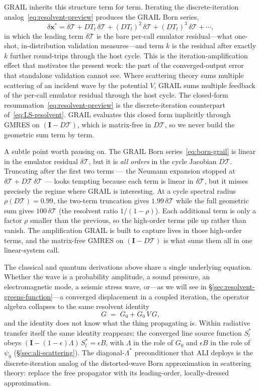 \documentclass[11pt]{article}
\newcommand{\Lop}{\Lambda}
\newcommand{\Lstar}{\Lambda^{*}}
\newcommand{\Tcyc}{\mathcal{T}}
\newcommand{\dT}{\delta\Tcyc}
\begin{document}
GRAIL inherits this structure term for term.  Iterating the
discrete-iteration analog~\eqref{eq:resolvent-preview} produces the
GRAIL Born series,
\begin{equation}
\delta\mathbf{x}^{*} = \dT + DT_t\,\dT + (DT_t)^2\,\dT + (DT_t)^3\,\dT + \cdots ,
\label{eq:born-grail}
\end{equation}
in which the leading term $\dT$ is the bare per-call emulator
residual---what one-shot, in-distribution validation measures---and
term $k$ is the residual after exactly $k$ further round-trips
through the host cycle.  This is the iteration-amplification effect
that motivates the present work: the part of the converged-output
error that standalone validation cannot see.  Where scattering theory
sums multiple scattering of an incident wave by the potential $V$,
GRAIL sums multiple feedback of the per-call emulator residual through
the host cycle.  The closed-form resummation~\eqref{eq:resolvent-preview}
is the discrete-iteration counterpart of~\eqref{eq:LS-resolvent}.
GRAIL evaluates this closed form implicitly through GMRES on
$(\mathbf{I} - D\Tcyc)$, which is matrix-free in $D\Tcyc$, so we never
build the geometric sum term by term.

A subtle point worth pausing on.  The GRAIL Born
series~\eqref{eq:born-grail} is linear in the emulator residual $\dT$,
but it is \emph{all orders} in the cycle Jacobian $D\Tcyc$.  Truncating
after the first two terms --- the Neumann expansion stopped at
$\dT + D\Tcyc\,\dT$ --- looks tempting because each term is linear in
$\dT$, but it misses precisely the regime where GRAIL is interesting.
At a cycle spectral radius $\rho(D\Tcyc) = 0.99$, the two-term
truncation gives $1.99\,\dT$ while the full geometric sum gives
$100\,\dT$ (the resolvent ratio $1/(1-\rho)$).  Each additional term is
only a factor $\rho$ smaller than the previous, so the high-order
terms pile up rather than vanish.  The amplification GRAIL is built
to capture lives in those high-order terms, and the matrix-free GMRES
on $(\mathbf{I} - D\Tcyc)$ is what sums them all in one linear-system
call.

The classical and quantum derivations above share a single underlying
equation.  Whether the wave is a probability amplitude, a sound
pressure, an electromagnetic mode, a seismic stress wave, or---as we
will see in \S\ref{sec:resolvent-greens-function}---a converged
displacement in a coupled iteration, the operator algebra collapses
to the same resolvent identity
\begin{equation}
G \;=\; G_0 + G_0\,V\,G,
\label{eq:resolvent-identity}
\end{equation}
and the identity does not know what the thing propagating is.  Within
radiative transfer itself the same identity reappears: the converged
line source function $S_l^*$ obeys
$(\mathbf{I} - (1 - \epsilon)\Lop)\,S_l^* = \epsilon B$, with $\Lop$
in the role of $G_0$ and $\epsilon B$ in the role of $\psi_0$
(\S\ref{sec:ali-scattering}).  The diagonal-$\Lstar$ preconditioner
that ALI deploys is the discrete-iteration analog of the
distorted-wave Born approximation in scattering theory: replace the
free propagator with its leading-order, locally-dressed
approximation.
\end{document}
